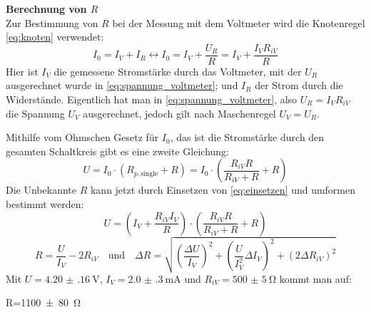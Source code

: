 {\textbf{Berechnung von \(R\)}}\\
Zur Bestimmung von \(R\) bei der Messung mit dem Voltmeter wird die Knotenregel \cref{eq:knoten} verwendet:
\begin{equation}
    I_0=I_V+I_R\leftrightarrow I_0=I_V+\frac{U_R}{R}=I_V+\frac{I_V R_{iV}}{R}
    \label{eq:einsetzen}
\end{equation}
Hier ist \(I_V\) die gemessene Stromstärke durch das Voltmeter, mit der \(U_R\) ausgerechnet wurde in \cref{eq:spannung_voltmeter}; und \(I_R\) der Strom durch die Widerstände. Eigentlich hat man in \cref{eq:spannung_voltmeter}, also \(U_R=I_V R_{iV}\) die Spannung \(U_V\) ausgerechnet, jedoch gilt nach Maschenregel \(U_V=U_R\). 

Mithilfe vom Ohmschen Gesetz für \(I_0\), das ist die Stromstärke durch den gesamten Schaltkreis gibt es eine zweite Gleichung:
\begin{equation}
    U=I_0\cdot (R_{p, \text{single}}+R)=I_0\cdot (\frac{R_{iV}R}{R_{iV}+R}+R)
\end{equation}
Die Unbekannte \(R\) kann jetzt durch Einsetzen von \cref{eq:einsetzen} und umformen bestimmt werden:
\begin{equation}
    U=\left(I_V+\frac{R_{iV}I_V}{R}\right)\cdot \left(\frac{R_{iV}R}{R_{iV}+R}+R\right)
\end{equation}
\begin{equation}
    R=\frac{U}{I_V}-2R_{iV}
    \quad\text{und}\quad \Delta R=\sqrt{\left(\frac{\Delta U}{I_V}\right)^2+\left(\frac{U}{I_V^2}\Delta I_V\right)^2+(2\Delta R_{iV})^2}
\end{equation}
Mit \(U=\qty{4.20(16)}{\volt}\), \(I_V=\qty{2.0(3)}{\milli\ampere}\) und \(R_{iV}=\qty{500(5)}{\ohm}\) kommt man auf:
\begin{rb}
    R=\qty{1100(80)}{\ohm}
\end{rb}


